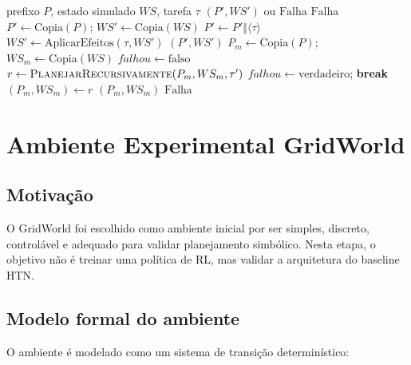 \begin{algorithm}[H]
\caption{Método \texttt{recursive\_planning} com backtracking por método}
\label{alg:planejar-recursivamente}
\begin{algorithmic}[1]
\Require prefixo $P$, estado simulado $WS$, tarefa $\tau$
\Ensure $(P', WS')$ ou $\mathrm{Falha}$
    \State \Return $\mathrm{Falha}$
  \EndIf
  \State $P' \gets \mathrm{Copia}(P)$; $WS' \gets \mathrm{Copia}(WS)$
  \State $P' \gets P' \mathbin{\Vert} \langle\tau\rangle$
  \State $WS' \gets \mathrm{AplicarEfeitos}(\tau, WS')$
  \State \Return $(P', WS')$
\EndIf
{}
    \State $P_m \gets \mathrm{Copia}(P)$; $WS_m \gets \mathrm{Copia}(WS)$
    \State $falhou \gets \mathrm{falso}$
      \State $r \gets \Call{PlanejarRecursivamente}{P_m, WS_m, \tau'}$
        \State $falhou \gets \mathrm{verdadeiro}$; \State \textbf{break}
      \EndIf
      \State $(P_m, WS_m) \gets r$
    \EndFor
      \State \Return $(P_m, WS_m)$
    \EndIf
  \EndFor
\EndIf
\State \Return $\mathrm{Falha}$
\end{algorithmic}
\end{algorithm}

\chapter{Ambiente Experimental GridWorld}

\section{Motivação}

O GridWorld foi escolhido como ambiente inicial por ser simples, discreto,
controlável e adequado para validar planejamento simbólico.
Nesta etapa, o objetivo não é treinar uma política de RL, mas validar a
arquitetura do baseline HTN.

\section{Modelo formal do ambiente}

O ambiente é modelado como um sistema de transição determinístico:

